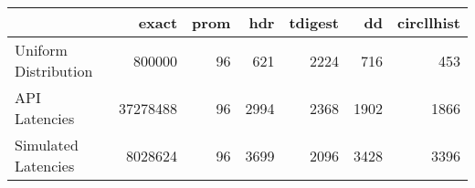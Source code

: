 \begin{tabular}{lrrrrrr}
\toprule
{} &     exact &  prom &  hdr &  tdigest &    dd &  circllhist \\
\midrule
Uniform Distribution &    800000 &    96 &  621 &     2224 &   716 &         453 \\
API Latencies        &  37278488 &    96 & 2994 &     2368 &  1902 &        1866 \\
Simulated Latencies  &   8028624 &    96 & 3699 &     2096 &  3428 &        3396 \\
\bottomrule
\end{tabular}
